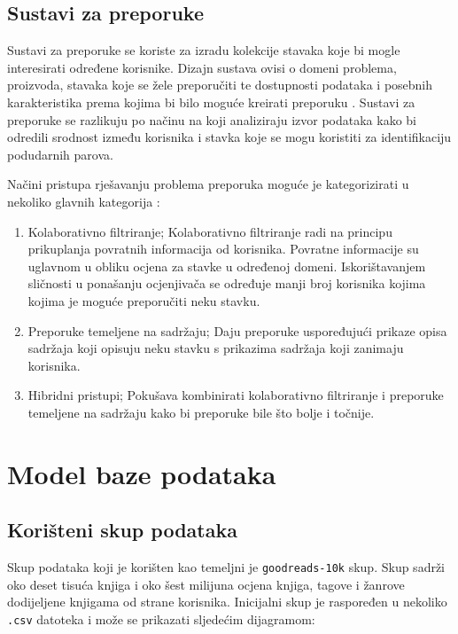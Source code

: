 \documentclass[]{foi}
\begin{document}
\section{Sustavi za preporuke}

Sustavi za preporuke se koriste za izradu kolekcije stavaka koje bi mogle interesirati određene korisnike.
Dizajn sustava ovisi o domeni problema, proizvoda, stavaka koje se žele preporučiti te dostupnosti podataka i posebnih
karakteristika prema kojima bi bilo moguće kreirati preporuku \cite{melville2010recommender}.
Sustavi za preporuke se razlikuju po načinu na koji analiziraju izvor podataka kako bi odredili
srodnost između korisnika i stavka koje se mogu koristiti za identifikaciju podudarnih parova.

Načini pristupa rješavanju problema preporuka moguće je kategorizirati u nekoliko glavnih kategorija \cite{lu2012recommender}:
\begin{enumerate}
	\item Kolaborativno filtriranje; Kolaborativno filtriranje radi na principu prikuplanja povratnih informacija od korisnika.
	      Povratne informacije su uglavnom u obliku ocjena za stavke u određenoj domeni. Iskorištavanjem sličnosti u ponašanju
	      ocjenjivača se određuje manji broj korisnika kojima kojima je moguće preporučiti neku stavku.
	\item Preporuke temeljene na sadržaju; Daju preporuke uspoređujući prikaze opisa sadržaja koji opisuju neku stavku s
	      prikazima sadržaja koji zanimaju korisnika.
	\item Hibridni pristupi; Pokušava kombinirati kolaborativno filtriranje i preporuke temeljene na sadržaju kako bi
	      preporuke bile što bolje i točnije.
\end{enumerate}

\chapter{Model baze podataka}

\section{Korišteni skup podataka}

Skup podataka koji je korišten kao temeljni je \texttt{goodreads-10k} skup. Skup sadrži oko deset tisuća knjiga i oko šest milijuna ocjena
knjiga, tagove i žanrove dodijeljene knjigama od strane korisnika. Inicijalni skup je raspoređen u nekoliko \texttt{.csv} datoteka i može
se prikazati sljedećim dijagramom:
\end{document}
